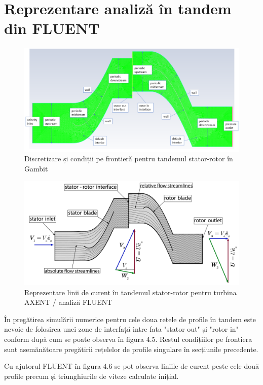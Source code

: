 \clearpage

\section{Reprezentare analiză în tandem din FLUENT}

\begin{figure}[h]
	\centering
	\includegraphics[scale=0.45]{figures/mesh-tandem-boundary.PNG}
	\caption{Discretizare și condiții pe frontieră pentru tandemul stator-rotor în Gambit}
	\label{Discretizare și condiții pe frontieră pentru tandemul stator-rotor în Gambit}
\end{figure}

\begin{figure}[!h]
	\centering
	\includegraphics[scale=0.5]{figures/AXENT-tandem-streamlines.PNG}
	\caption{Reprezentare linii de curent în tandemul stator-rotor pentru turbina AXENT / analiză FLUENT}
	\label{Reprezentare linii de curent în tandemul stator-rotor pentru turbina AXENT / analiză FLUENT}
\end{figure}


În pregătirea simulării numerice pentru cele doua rețele de profile în tandem este nevoie de folosirea unei zone de interfață intre fata "stator out" și "rotor in" conform după cum se poate observa în figura 4.5. Restul condițiilor pe frontiera sunt asemănătoare pregătirii rețelelor de profile singulare în secțiunile precedente.

Cu ajutorul FLUENT în figura 4.6 se pot observa liniile de curent peste cele două profile precum și triunghiurile de viteze calculate inițial.

\clearpage
